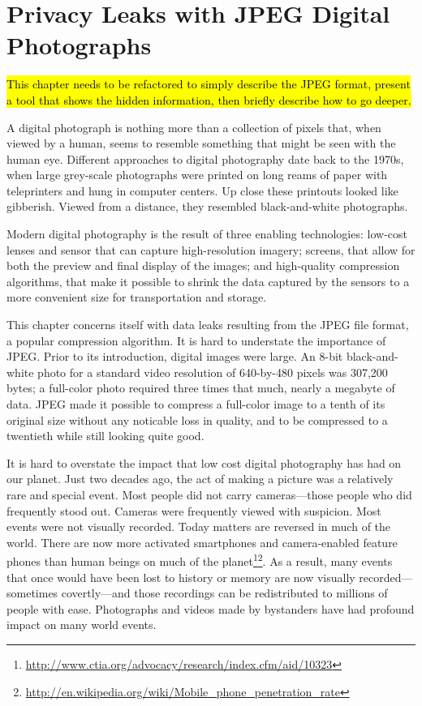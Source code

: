 \chapter{Privacy Leaks with JPEG Digital Photographs}\label{ch-jpeg}

\hl{This chapter needs to be refactored to simply describe the JPEG
  format, present a tool that shows the hidden information, then
  briefly describe how to go deeper.}

A digital photograph is nothing more than a collection of
pixels that, when viewed by a human, seems to resemble something that
might be seen with the human eye. Different approaches to digital
photography date back to the 1970s, when large grey-scale photographs
were printed on long reams of paper with teleprinters and hung in
computer centers. Up close these printouts looked like
gibberish. Viewed from a distance, they resembled black-and-white photographs.

Modern digital photography is the result of three enabling
technologies: low-cost lenses and sensor that can capture
high-resolution imagery; screens, that allow for both the preview and
final display of the images; and high-quality compression algorithms,
that make it possible to shrink the data captured by the sensors to a
more convenient size for transportation and storage.

This chapter concerns itself with data leaks resulting from the JPEG
file format, a popular compression algorithm. It is hard to understate
the importance of JPEG. Prior to its introduction, digital images were
large. An 8-bit black-and-white photo for a standard video resolution
of 640-by-480 pixels was 307,200 bytes; a full-color photo required
three times that much, nearly a megabyte of data. JPEG made it
possible to compress a full-color image to a tenth of its original
size without any noticable loss in quality, and to be compressed to a
twentieth while still looking quite good.

It is hard to overstate the impact that low cost digital photography
has had on our planet. Just two decades ago, the act of making a
picture was a relatively rare and special event. Most people did not
carry cameras---those people who did frequently stood out. Cameras
were frequently viewed with suspicion. Most events were not visually
recorded. Today matters are reversed in much of the world. There are
now more activated smartphones and camera-enabled feature phones than
human beings on much of the
planet\footnote{\url{http://www.ctia.org/advocacy/research/index.cfm/aid/10323}}\footnote{\url{http://en.wikipedia.org/wiki/Mobile_phone_penetration_rate}}. As
a result, many events that once would have been lost to history or
memory are now visually recorded---sometimes covertly---and those
recordings can be redistributed to millions of people with
ease. Photographs and videos made by bystanders have had profound
impact on many world events.


